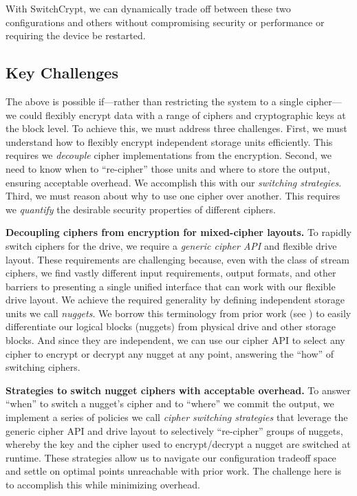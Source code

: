 With SwitchCrypt, we can dynamically trade off between these two configurations
and others without compromising security or performance or requiring the device
be restarted.

\subsection{Key Challenges}

The above is possible if---rather than restricting the system to a single
cipher---we could flexibly encrypt data with a range of ciphers and
cryptographic keys at the block level. To achieve this, we must address three
challenges. First, we must understand how to flexibly encrypt independent
storage units efficiently. This requires we \emph{decouple} cipher
implementations from the encryption. Second, we need to know when to
``re-cipher'' those units and where to store the output, ensuring acceptable
overhead. We accomplish this with our \emph{switching strategies}. Third, we
must reason about why to use one cipher over another. This requires we
\emph{quantify} the desirable security properties of different ciphers.

\textbf{Decoupling ciphers from encryption for mixed-cipher layouts.} To rapidly
switch ciphers for the drive, we require a \emph{generic cipher API} and
flexible drive layout. These requirements are challenging because, even with the
class of stream ciphers, we find vastly different input requirements, output
formats, and other barriers to presenting a single unified interface that can
work with our flexible drive layout. We achieve the required generality by
defining independent storage units we call \emph{nuggets}. We borrow this
terminology from prior work (see \cite{StrongBox}) to easily differentiate our
logical blocks (nuggets) from physical drive and other storage blocks. And since
they are independent, we can use our cipher API to select any cipher to encrypt
or decrypt any nugget at any point, answering the ``how'' of switching ciphers.

\textbf{Strategies to switch nugget ciphers with acceptable overhead.} To answer
``when'' to switch a nugget's cipher and to ``where'' we commit the output, we
implement a series of policies we call \textit{cipher switching strategies} that
leverage the generic cipher API and drive layout to selectively ``re-cipher''
groups of nuggets, whereby the key and the cipher used to encrypt/decrypt a
nugget are switched at runtime. These strategies allow us to navigate our
configuration tradeoff space and settle on optimal points unreachable with prior
work. The challenge here is to accomplish this while minimizing overhead.

